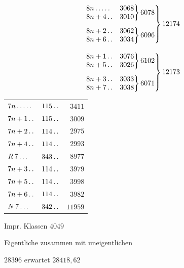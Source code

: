 \[
\begin{aligned}
&\left.\begin{gathered}
\left.\begin{array}{@{}lr@{}}8n\mathinner{.\,.\,.\,.\,.}&3068\\8n+4\mathinner{.\,.}&3010\end{array}\right\}6078\\[4pt]
\left.\begin{array}{@{}lr@{}}8n+2\mathinner{.\,.}&3062\\8n+6\mathinner{.\,.}&3034\end{array}\right\}6096
\end{gathered}\right\}12174\\[8pt]
&\left.\begin{gathered}
\left.\begin{array}{@{}lr@{}}8n+1\mathinner{.\,.}&3076\\8n+5\mathinner{.\,.}&3026\end{array}\right\}6102\\[4pt]
\left.\begin{array}{@{}lr@{}}8n+3\mathinner{.\,.}&3033\\8n+7\mathinner{.\,.}&3038\end{array}\right\}6071
\end{gathered}\right\}12173
\end{aligned}
\]
\begin{center}\begin{tabular}{@{}lrr@{}}
$7n\mathinner{.\,.\,.\,.\,.}$ & $115\mathinner{.\,.}$ & $3411$\\
$7n+1\mathinner{.\,.}$ & $115\mathinner{.\,.}$ & $3009$\\
$7n+2\mathinner{.\,.}$ & $114\mathinner{.\,.}$ & $2975$\\
$7n+4\mathinner{.\,.}$ & $114\mathinner{.\,.}$ & $2993$\\
$R\,7\mathinner{.\,.\,.}$ & $343\mathinner{.\,.}$ & $8977$\\
$7n+3\mathinner{.\,.}$ & $114\mathinner{.\,.}$ & $3979$\\
$7n+5\mathinner{.\,.}$ & $114\mathinner{.\,.}$ & $3998$\\
$7n+6\mathinner{.\,.}$ & $114\mathinner{.\,.}$ & $3982$\\
$N\,7\mathinner{.\,.\,.}$ & $342\mathinner{.\,.}$ & $11959$
\end{tabular}\end{center}
\noindent Impr. Klassen $4049$
\par\noindent Eigentliche zusammen mit uneigentlichen
\par\noindent\quad $28396$ erwartet $28418{,}62$
